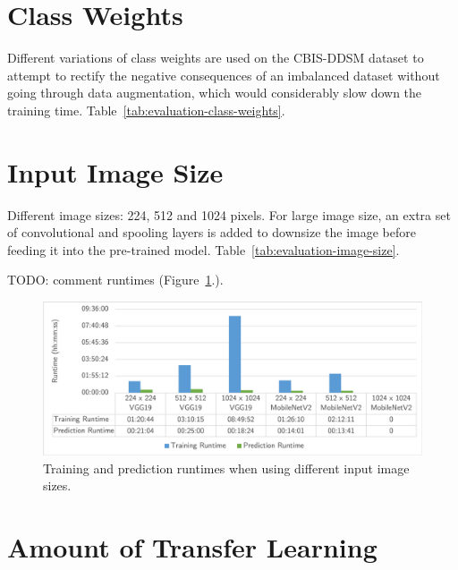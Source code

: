 
\section{Class Weights}

Different variations of class weights are used on the CBIS-DDSM dataset to attempt to rectify the negative consequences of an imbalanced dataset without going through data augmentation, which would considerably slow down the training time. Table~\ref{tab:evaluation-class-weights}.




\section{Input Image Size}

Different image sizes: 224, 512 and 1024 pixels. For large image size, an extra set of convolutional and spooling layers is added  to downsize the image before feeding it into the pre-trained model. Table~\ref{tab:evaluation-image-size}.



TODO: comment runtimes (Figure~\ref{fig:evaluation-image_size_experiment-runtimes}.).


\begin{figure}[ht]
\centerline{\includegraphics[width=\textwidth]{figures/evaluation/image_size_experiment/runtimes.png}}
\caption{\label{fig:evaluation-image_size_experiment-runtimes}Training and prediction runtimes when using different input image sizes.}
\end{figure}


\section{Amount of Transfer Learning}
\label{sec:evaluation-transfer-learning}

